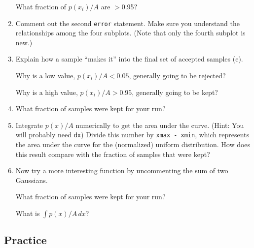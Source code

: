 \documentclass[11pt,titlepage,fleqn]{article}
\begin{document}
\begin{enumerate}
What fraction of $p(x_i)/A$ are $>$0.95?

\vertgap

\item Comment out the second \verb+error+ statement. Make sure you understand the relationships among the four subplots. (Note that only the fourth subplot is new.)

\vertgap

\item Explain how a sample ``makes it'' into the final set of accepted samples (e).

Why is a low value, $p(x_i)/A < 0.05$, generally going to be rejected?

Why is a high value, $p(x_i)/A > 0.95$, generally going to be kept?

\vertgap

\item What fraction of samples were kept for your run?

\vertgap

\item Integrate $p(x)/A$ numerically to get the area under the curve. (Hint: You will probably need \verb+dx+) Divide this number by \verb+xmax - xmin+, which represents the area under the curve for the (normalized) uniform distribution. How does this result compare with the fraction of samples that were kept?

\vertgap

\item Now try a more interesting function by uncommenting the sum of two Gaussians.

What fraction of samples were kept for your run?

What is $\int p(x)/A \, dx$?

\end{enumerate}


\subsection*{Practice}
\end{document}
